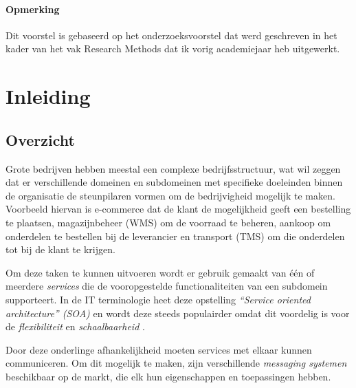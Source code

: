 

\paragraph{Opmerking}

Dit voorstel is gebaseerd op het onderzoeksvoorstel dat werd geschreven in het
kader van het vak Research Methods dat ik vorig academiejaar heb
uitgewerkt.

\section{Inleiding}%
\label{sec:inleiding}

\subsection{Overzicht}
Grote bedrijven hebben meestal een complexe bedrijfsstructuur, wat wil zeggen dat er verschillende 
domeinen en subdomeinen met specifieke doeleinden binnen de organisatie de steunpilaren vormen om de bedrijvigheid mogelijk te maken. 
Voorbeeld hiervan is e-commerce dat de klant de mogelijkheid geeft een bestelling te plaatsen, 
magazijnbeheer (WMS) om de voorraad te beheren, aankoop om onderdelen te bestellen bij de leverancier en transport (TMS) 
om die onderdelen tot bij de klant te krijgen. 
\newline 

Om deze taken te kunnen uitvoeren wordt er gebruik gemaakt van één of meerdere \emph{services} die de vooropgestelde 
functionaliteiten van een subdomein supporteert. 
In de IT terminologie heet deze opstelling \emph{“Service oriented architecture” (SOA)} 
en wordt deze steeds populairder omdat dit voordelig is voor de \emph{flexibiliteit} en \emph{schaalbaarheid} \autocite{Bellemare2020}.
\newline 

Door deze onderlinge afhankelijkheid moeten services met elkaar kunnen communiceren.
Om dit mogelijk te maken, zijn verschillende \emph{messaging systemen} beschikbaar op de markt, 
die elk hun eigenschappen en toepassingen hebben. 
\newline 

